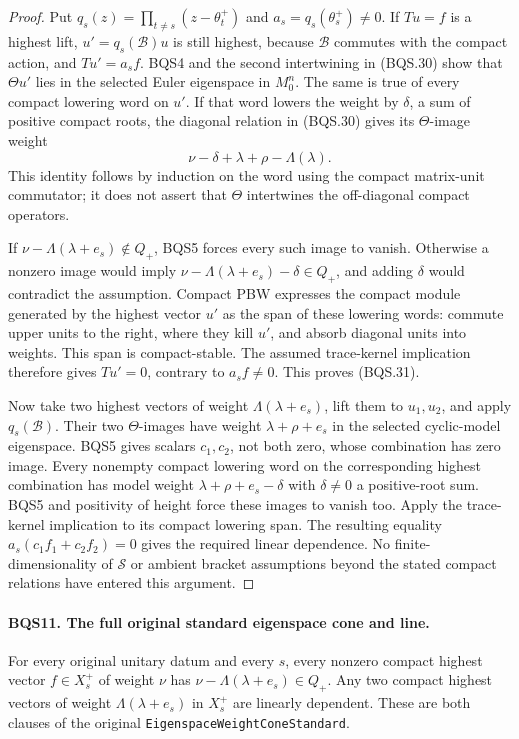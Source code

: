 \documentclass[11pt,a4paper]{article}
\numberwithin{equation}{section}
\theoremstyle{remark}\newtheorem{remark}[theorem]{Remark}
\begin{document}
\begin{proof}
Put $q_s(z)=\prod_{t\ne s}(z-\theta_t^+)$ and
$a_s=q_s(\theta_s^+)\ne0$.
If $Tu=f$ is a highest lift, $u'=q_s(\mathcal B)u$ is still highest,
because $\mathcal B$ commutes with the compact action, and
$Tu'=a_sf$.
BQS4 and the second intertwining in (BQS.30) show that
$\Theta u'$ lies in the selected Euler eigenspace in $M_0^n$.
The same is true of every compact lowering word on $u'$.
If that word lowers the weight by $\delta$, a sum of positive compact
roots, the diagonal relation in (BQS.30) gives its $\Theta$-image
weight
\[
                  \nu-\delta+\lambda+\rho-\Lambda(\lambda).
 \tag{BQS.32}
\]
This identity follows by induction on the word using the compact
matrix-unit commutator; it does not assert that $\Theta$ intertwines
the off-diagonal compact operators.

If $\nu-\Lambda(\lambda+e_s)\notin Q_+$, BQS5 forces every such
image to vanish.  Otherwise a nonzero image would imply
$\nu-\Lambda(\lambda+e_s)-\delta\in Q_+$, and adding $\delta$
would contradict the assumption.  Compact PBW expresses the compact
module generated by the highest vector $u'$ as the span of these
lowering words: commute upper units to the right, where they kill
$u'$, and absorb diagonal units into weights.
This span is compact-stable.  The assumed trace-kernel implication
therefore gives $Tu'=0$, contrary to $a_sf\ne0$.
This proves (BQS.31).

Now take two highest vectors of weight $\Lambda(\lambda+e_s)$,
lift them to $u_1,u_2$, and apply $q_s(\mathcal B)$.
Their two $\Theta$-images have weight $\lambda+\rho+e_s$ in the
selected cyclic-model eigenspace.  BQS5 gives scalars $c_1,c_2$,
not both zero, whose combination has zero image.
Every nonempty compact lowering word on the corresponding highest
combination has model weight $\lambda+\rho+e_s-\delta$ with
$\delta\ne0$ a positive-root sum.  BQS5 and positivity of height
force these images to vanish too.
Apply the trace-kernel implication to its compact lowering span.
The resulting equality
$a_s(c_1f_1+c_2f_2)=0$ gives the required linear dependence.
No finite-dimensionality of $\mathcal S$ or ambient bracket assumptions
beyond the stated compact relations have entered this argument.
\end{proof}

\paragraph{BQS11. The full original standard eigenspace cone and line.}
\label{claim:BQS11}
For every original unitary datum and every $s$, every nonzero compact
highest vector $f\in X_s^+$ of weight $\nu$ has
$\nu-\Lambda(\lambda+e_s)\in Q_+$.
Any two compact highest vectors of weight $\Lambda(\lambda+e_s)$
in $X_s^+$ are linearly dependent.  These are both clauses of the
original \texttt{Eigenspace\allowbreak Weight\allowbreak Cone\allowbreak Standard}.
\end{document}
